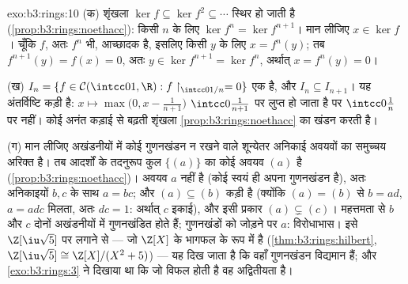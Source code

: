 \begin{solution}{exo:b3:rings:10}
(क) शृंखला $\ker f \subseteq \ker f^2 \subseteq \cdots$ स्थिर हो जाती है (\cref{prop:b3:rings:noethacc}): किसी $n$ के लिए $\ker f^n = \ker
f^{n+1}$।
मान लीजिए $x \in \ker f$। चूँकि $f$, अतः $f^n$ भी, आच्छादक है, इसलिए किसी
$y$ के लिए $x = f^n(y)$; तब $f^{n+1}(y) = f(x) =
0$, अतः $y \in \ker f^{n+1} = \ker f^n$, अर्थात् $x = f^n(y) = 0$।

(ख) $I_n = \{f \in \mathcal C(\intcc01, \R) : f\restriction_{
\intcc0{1/n}} = 0\}$ एक  है, और $I_n \subseteq I_{n+1}$। यह अंतर्विष्टि कड़ी है: $x \mapsto \max\bigl(0, x -
\frac1{n+1}\bigr)$ $\intcc0{\frac1{n+1}}$
पर लुप्त हो जाता है पर $\intcc0{\frac1n}$ पर नहीं। कोई अनंत कड़ाई से बढ़ती शृंखला
\cref{prop:b3:rings:noethacc} का खंडन करती है।

(ग) मान लीजिए अखंडनीयों में कोई गुणनखंडन न रखने वाले शून्येतर अनिकाई
अवयवों का समुच्चय अरिक्त है। तब आदर्शों के तदनुरूप कुल $\{(a)\}$ का कोई
 अवयव $(a)$ है (\cref{prop:b3:rings:noethacc})। अवयव $a$  नहीं है (कोई
 स्वयं ही अपना गुणनखंडन है), अतः अनिकाइयों $b, c$ के साथ $a = bc$;
और $(a) \subseteq (b)$ कड़ी है (क्योंकि $(a) =
(b)$ से $b = ad$, $a = adc$ मिलता, अतः $dc = 1$:
अर्थात् $c$ इकाई), और इसी प्रकार $(a) \subsetneq (c)$। महत्तमता से $b$ और $c$
दोनों अखंडनीयों में गुणनखंडित होते हैं; गुणनखंडों को जोड़ने पर $a$:
विरोधाभास। इसे $\Z[\iu\sqrt5]$ पर लगाने से --- जो $\Z[X]$ के भागफल के रूप में
 है (\cref{thm:b3:rings:hilbert}, $\Z[\iu\sqrt5]
\cong \Z[X]/(X^2+5)$) --- यह दिख जाता है कि वहाँ गुणनखंडन
विद्यमान हैं; और \cref{exo:b3:rings:3} ने दिखाया था कि जो विफल होती है वह अद्वितीयता
है।
\end{solution}

